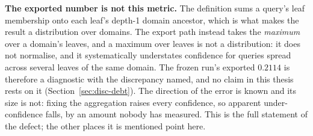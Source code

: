 \textbf{The exported number is not this metric.} The definition sums a query's leaf
membership onto each leaf's depth-1 domain ancestor, which is what makes the result a
distribution over domains. The export path instead takes the \emph{maximum} over a
domain's leaves, and a maximum over leaves is not a distribution: it does not
normalise, and it systematically understates confidence for queries spread across
several leaves of the same domain. The frozen run's exported $0.2114$ is therefore a
diagnostic with the discrepancy named, and no claim in this thesis rests on it
(Section~\ref{sec:disc-debt}). The direction of the error is known and its size is
not: fixing the aggregation raises every confidence, so apparent under-confidence
falls, by an amount nobody has measured. This is the full statement of the defect; the
other places it is mentioned point here.

